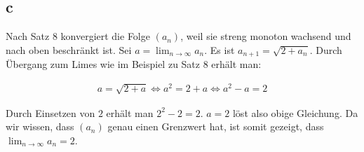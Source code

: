 \documentclass[a4paper,10pt]{article}
\begin{document}
\subsection*{c}

Nach Satz 8 konvergiert die Folge $(a_n)$, weil sie streng monoton wachsend und nach oben beschränkt ist.
Sei $a = \lim_{n \rightarrow \infty} a_n$.
Es ist $a_{n + 1} = \sqrt{2 + a_n}$.
Durch Übergang zum Limes wie im Beispiel zu Satz 8 erhält man:

\begin{align*}
 a = \sqrt{2 + a} \Leftrightarrow a^2 = 2 + a \Leftrightarrow a^2 - a = 2
\end{align*}

Durch Einsetzen von $2$ erhält man $2^2 - 2 = 2$.
$a = 2$ löst also obige Gleichung.
Da wir wissen, dass $(a_n)$ genau einen Grenzwert hat, ist somit gezeigt, dass $\lim_{n \rightarrow \infty} a_n = 2$.
\end{document}
